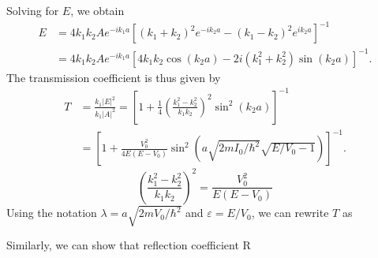 Solving for $E$, we obtain
$$
\begin{aligned}
E &=4 k_{1} k_{2} A e^{-i k_{1} a}\left[\left(k_{1}+k_{2}\right)^{2} e^{-i k_{2} a}-\left(k_{1}-k_{2}\right)^{2} e^{i k_{2} a}\right]^{-1} \\
&=4 k_{1} k_{2} A e^{-i k_{1} a}\left[4 k_{1} k_{2} \cos \left(k_{2} a\right)-2 i\left(k_{1}^{2}+k_{2}^{2}\right) \sin \left(k_{2} a\right)\right]^{-1} .
\end{aligned}
$$
The transmission coefficient is thus given by
$$
\begin{aligned}
T &=\frac{k_{1}|E|^{2}}{k_{1}|A|^{2}}=\left[1+\frac{1}{4}\left(\frac{k_{1}^{2}-k_{2}^{2}}{k_{1} k_{2}}\right)^{2} \sin ^{2}\left(k_{2} a\right)\right]^{-1} \\
&=\left[1+\frac{V_{0}^{2}}{4 E\left(E-V_{0}\right)} \sin ^{2}\left(a \sqrt{2 m I_{0} / \hbar^{2}} \sqrt{E / V_{0}-1}\right)\right]^{-1} .
\end{aligned}
$$
$$\left(\frac{k_{1}^{2}-k_{2}^{2}}{k_{1} k_{2}}\right)^{2}=\frac{V_{0}^{2}}{E\left(E-V_{0}\right)}$$
Using the notation $\lambda=a \sqrt{2 m V_{0} / \hbar^{2}}$ and $\varepsilon=E / V_{0}$, we can rewrite $T$ as
\begin{center}
\end{center}

Similarly, we can show that reflection coefficient R
\begin{center}
\end{center}

